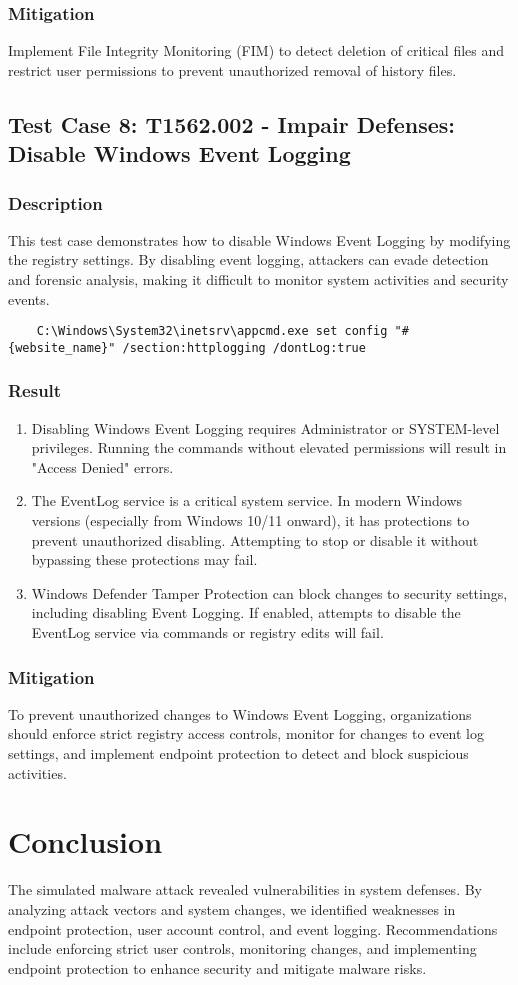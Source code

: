 \documentclass[11pt]{article}
\begin{document}
\subsubsection{Mitigation}
Implement File Integrity Monitoring (FIM) to detect deletion of critical files and restrict user permissions to prevent unauthorized removal of history files.
\subsection{Test Case 8: T1562.002 - Impair Defenses: Disable Windows Event Logging}
\subsubsection{Description}
This test case demonstrates how to disable Windows Event Logging by modifying the registry settings. By disabling event logging, attackers can evade detection and forensic analysis, making it difficult to monitor system activities and security events.
\begin{lstlisting}
    C:\Windows\System32\inetsrv\appcmd.exe set config "#{website_name}" /section:httplogging /dontLog:true
\end{lstlisting}
\subsubsection{Result}
\begin{enumerate}
    \item Disabling Windows Event Logging requires Administrator or SYSTEM-level privileges. Running the commands without elevated permissions will result in "Access Denied" errors.
    \item The EventLog service is a critical system service. In modern Windows versions (especially from Windows 10/11 onward), it has protections to prevent unauthorized disabling. Attempting to stop or disable it without bypassing these protections may fail.
    \item Windows Defender Tamper Protection can block changes to security settings, including disabling Event Logging. If enabled, attempts to disable the EventLog service via commands or registry edits will fail.
\end{enumerate}
\subsubsection{Mitigation}
To prevent unauthorized changes to Windows Event Logging, organizations should enforce strict registry access controls, monitor for changes to event log settings, and implement endpoint protection to detect and block suspicious activities.
\section{Conclusion}
The simulated malware attack revealed vulnerabilities in system defenses. By analyzing attack vectors and system changes, we identified weaknesses in endpoint protection, user account control, and event logging. Recommendations include enforcing strict user controls, monitoring changes, and implementing endpoint protection to enhance security and mitigate malware risks.
\clearpage
\end{document}
